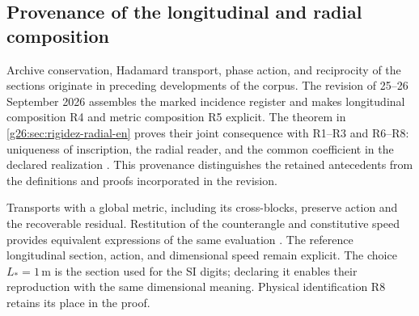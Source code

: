 \subsection{Provenance of the longitudinal and radial composition}

Archive conservation, Hadamard transport, phase action, and reciprocity
of the sections originate in preceding developments of the corpus.
The revision of 25--26 September 2026 assembles the marked incidence
register and makes longitudinal composition R4 and metric composition
R5 explicit. The theorem in \ref{g26:sec:rigidez-radial-en} proves their
joint consequence with R1--R3 and R6--R8: uniqueness of inscription,
the radial reader, and the common coefficient in the declared
realization \cite{hmtg26radial}. This provenance distinguishes the
retained antecedents from the definitions and proofs incorporated
in the revision.

Transports with a global metric, including its cross-blocks, preserve
action and the recoverable residual. Restitution of the counterangle
and constitutive speed provides equivalent expressions of the same
evaluation \cite{hmtg26metric,hmtg26counter}. The reference longitudinal
section, action, and dimensional speed remain explicit. The choice
\(L_*=1\,\mathrm m\) is the section used for the SI digits;
declaring it enables their reproduction with the same dimensional
meaning. Physical identification R8 retains its place in the proof.
